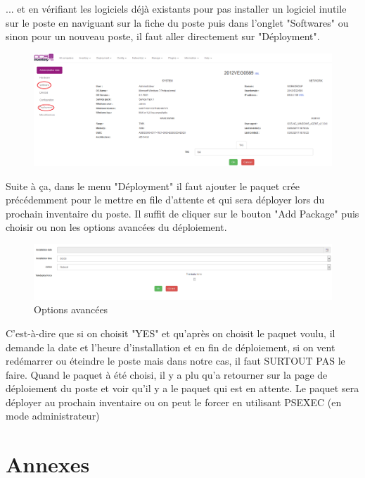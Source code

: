 \documentclass[11pt,a4paper,oneside]{article}
\begin{document}
... et en vérifiant les logiciels déjà existants pour pas installer un logiciel inutile sur le poste en naviguant sur la fiche du poste puis dans l'onglet "Softwares" ou sinon pour un nouveau poste, il faut aller directement sur "Déployment".
\begin{figure}[hbtp]
\centering
\includegraphics[scale=0.41]{Script/Act_Deploy2.PNG}
\end{figure}
Suite à ça, dans le menu "Déployment" il faut ajouter le paquet crée précédemment pour le mettre en file d'attente et qui sera déployer lors du prochain inventaire du poste. Il suffit de cliquer sur le bouton "Add Package" puis choisir ou non les options avancées du déploiement.
\begin{figure}[hbtp]
\centering
\includegraphics[scale=0.4]{Script/Act_Deploy4.PNG}
\caption{Options avancées}
\end{figure}

C'est-à-dire que si on choisit "YES" et qu'après on choisit le paquet voulu, il demande la date et l'heure d'installation et en fin de déploiement, si on vent redémarrer ou éteindre le poste mais dans notre cas, il faut SURTOUT PAS le faire. Quand le paquet à été choisi, il y a plu qu'a retourner sur la page de déploiement du poste et voir qu'il y a le paquet qui est en attente. Le paquet sera déployer au prochain inventaire ou on peut le forcer en utilisant PSEXEC (en mode administrateur)
\newpage
\section{Annexes}
\end{document}
